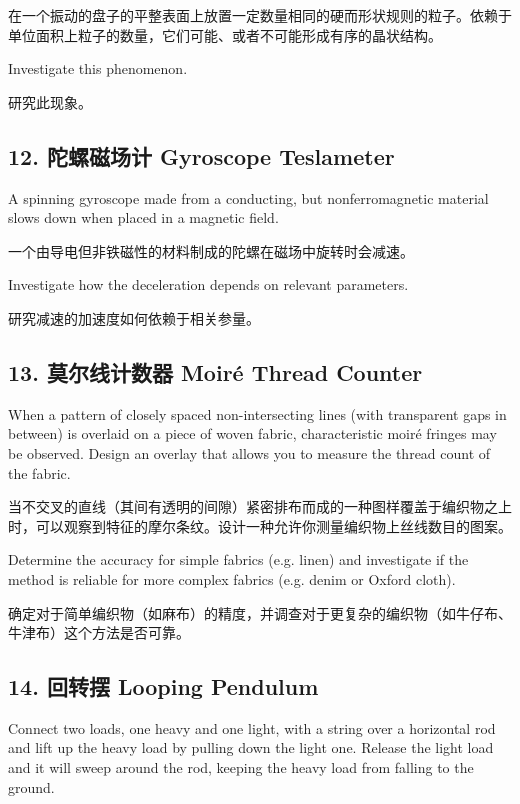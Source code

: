 \documentclass[a4paper,10pt,english]{sphinxmanual}
\begin{document}
在一个振动的盘子的平整表面上放置一定数量相同的硬而形状规则的粒子。依赖于单位面积上粒子的数量，它们可能、或者不可能形成有序的晶状结构。

Investigate this phenomenon.

研究此现象。


\subsection{12. 陀螺磁场计 Gyroscope Teslameter}
\label{\detokenize{7. Appendix:gyroscope-teslameter}}
A spinning gyroscope made from a conducting, but nonferromagnetic material slows down when placed in a magnetic field.

一个由导电但非铁磁性的材料制成的陀螺在磁场中旋转时会减速。

Investigate how the deceleration depends on relevant parameters.

研究减速的加速度如何依赖于相关参量。


\subsection{13. 莫尔线计数器 Moiré Thread Counter}
\label{\detokenize{7. Appendix:moire-thread-counter}}
When a pattern of closely spaced non-intersecting lines (with transparent gaps in between) is overlaid on a piece of woven fabric, characteristic moiré fringes may be observed. Design an overlay that allows you to measure the thread count of the fabric.

当不交叉的直线（其间有透明的间隙）紧密排布而成的一种图样覆盖于编织物之上时，可以观察到特征的摩尔条纹。设计一种允许你测量编织物上丝线数目的图案。

Determine the accuracy for simple fabrics (e.g. linen) and investigate if the method is reliable for more complex fabrics (e.g. denim or Oxford cloth).

确定对于简单编织物（如麻布）的精度，并调查对于更复杂的编织物（如牛仔布、牛津布）这个方法是否可靠。


\subsection{14. 回转摆 Looping Pendulum}
\label{\detokenize{7. Appendix:looping-pendulum}}
Connect two loads, one heavy and one light, with a string over a horizontal rod and lift up the heavy load by pulling down the light one. Release the light load and it will sweep around the rod, keeping the heavy load from falling to the ground.
\end{document}
